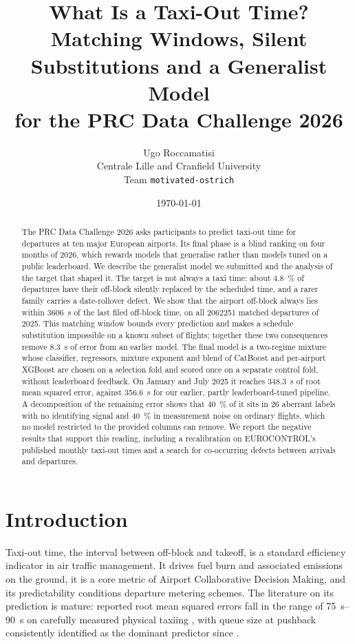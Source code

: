 \documentclass[11pt,a4paper]{article}
\title{What Is a Taxi-Out Time?\\
Matching Windows, Silent Substitutions and a Generalist Model\\
for the PRC Data Challenge 2026}
\author{Ugo Roccamatisi\\
\small Centrale Lille and Cranfield University\\
\small Team \texttt{motivated-ostrich}}
\date{\today}
\begin{document}
\maketitle

\begin{abstract}
The PRC Data Challenge 2026 asks participants to predict taxi-out time for
departures at ten major European airports. Its final phase is a blind ranking
on four months of 2026, which rewards models that generalise rather than
models tuned on a public leaderboard. We describe the generalist model we
submitted and the analysis of the target that shaped it. The target is not
always a taxi time: about \SI{4.8}{\percent} of departures have their off-block
silently replaced by the scheduled time, and a rarer family carries a
date-rollover defect. We show that the airport off-block always lies within
\SI{3606}{\second} of the last filed off-block time, on all
\num{2062251} matched departures of 2025. This matching window bounds every
prediction and makes a schedule substitution impossible on a known subset of
flights; together these two consequences remove \SI{8.3}{\second} of error from
an earlier model. The final model is a two-regime mixture whose classifier,
regressors, mixture exponent and blend of CatBoost and per-airport XGBoost are
chosen on a selection fold and scored once on a separate control fold, without
leaderboard feedback. On January and July 2025 it reaches
\SI{348.3}{\second} of root mean squared error, against \SI{356.6}{\second}
for our earlier, partly leaderboard-tuned pipeline. A decomposition of the
remaining error shows that \SI{40}{\percent} of it sits in 26 aberrant labels
with no identifying signal and \SI{40}{\percent} in measurement noise on
ordinary flights, which no model restricted to the provided columns can
remove. We report the negative results that support this reading, including a
recalibration on EUROCONTROL's published monthly taxi-out times and a search
for co-occurring defects between arrivals and departures.
\end{abstract}

\section{Introduction}

Taxi-out time, the interval between off-block and takeoff, is a standard
efficiency indicator in air traffic management. It drives fuel burn and
associated emissions on the ground, it is a core metric of Airport
Collaborative Decision Making, and its predictability conditions departure
metering schemes. The literature on its prediction is mature: reported root
mean squared errors fall in the range of \SIrange{75}{90}{\second} on
carefully measured physical taxiing \cite{ravizza2014}, with queue
size at pushback consistently identified as the dominant predictor since
\cite{idris2001}.
\end{document}
